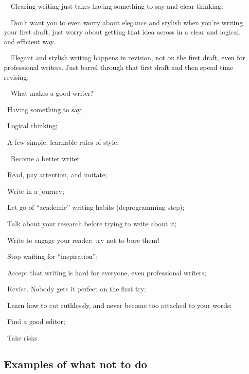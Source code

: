 \documentclass[a4paper, 12pt]{article}
\begin{document}
\par\ \textbullet\ Clearing writing just takes having something to say and clear thinking.

\par\ \textbullet\ Don't want you to even worry about elegance and stylish when you're writing your first draft, just worry about getting that idea across in a clear and logical, and efficient way.

\par\ \textbullet\ Elegant and stylish writing happens in revision, not on the first draft, even for professional writers. Just barrel through that first draft and then spend time revising.

\par\ \textbullet\ What makes a good writer?
\par\quad\textopenbullet\ Having something to say;
\par\quad\textopenbullet\ Logical thinking;
\par\quad\textopenbullet\ A few simple, learnable rules of style;

\par\ \textbullet\ Become a better writer
\par\quad\textopenbullet\ Read, pay attention, and imitate;
\par\quad\textopenbullet\ Write in a journey;
\par\quad\textopenbullet\ Let go of ``academic'' writing habits (deprogramming step);
\par\quad\textopenbullet\ Talk about your research before trying to write about it;
\par\quad\textopenbullet\ Write to engage your reader: try not to bore them!
\par\quad\textopenbullet\ Stop waiting for ``inspiration'';
\par\quad\textopenbullet\ Accept that writing is hard for everyone, even professional writers;
\par\quad\textopenbullet\ Revise. Nobody gets it perfect on the first try;
\par\quad\textopenbullet\ Learn how to cut ruthlessly, and never become too attached to your words;
\par\quad\textopenbullet\ Find a good editor;
\par\quad\textopenbullet\ Take risks.

\subsection{Examples of what not to do}
\end{document}
